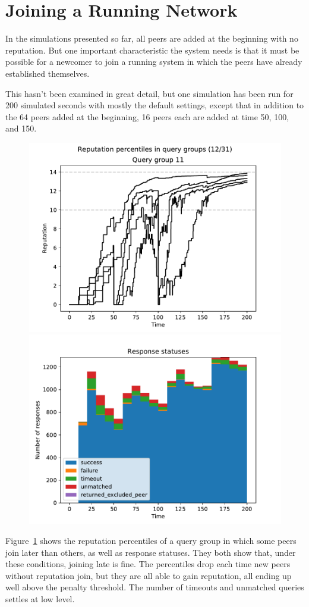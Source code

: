 \section{Joining a Running Network}
In the simulations presented so far, all peers are added at the beginning with
no reputation. But one important characteristic the system needs is that it must
be possible for a newcomer to join a running system in which the peers have
already established themselves.

This hasn't been examined in great detail, but one simulation has been run for
200 simulated seconds with mostly the default settings, except that in addition
to the 64 peers added at the beginning, 16 peers each are added at time 50, 100,
and 150.

\begin{figure}[t]
\centering
\includegraphics[width=0.5\columnwidth]{figures/3_times_16_rep_percs_12_of_31}%
\includegraphics[width=0.5\columnwidth]{figures/3_times_16_resp_statuses}
\label{fig:3_times_16}
\end{figure}

Figure~\ref{fig:3_times_16} shows the reputation percentiles of a query group
in which some peers join later than others, as well as response statuses.
They both show that, under these conditions, joining late is fine. The
percentiles drop each time new peers without reputation join, but they are all
able to gain reputation, all ending up well above the penalty threshold. The
number of timeouts and unmatched queries settles at low level.

